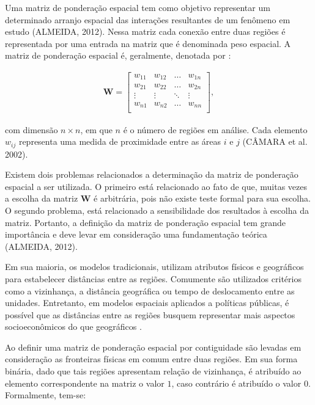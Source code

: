 \documentclass[12pt, a4paper,brazil,oneside]{article}
\begin{document}
	
	Uma matriz de ponderação espacial tem como objetivo representar um determinado arranjo espacial das interações resultantes de um fenômeno em estudo (ALMEIDA, 2012). Nessa matriz cada conexão entre duas regiões é representada por uma entrada na matriz que é denominada peso espacial. A matriz de ponderação espacial é, geralmente, denotada por : 
	
	\begin{align*}
	\boldsymbol{W} =
	\left[
	\begin{array}{cccc}
	w_{11} & w_{12} & \dots & w_{1n} \\
	w_{21} & w_{22} & \dots &w_{2n} \\
	\vdots & \vdots & \ddots & \vdots \\
	w_{n1} & w_{n2} & \dots & w_{nn}\\
	\end{array}
	\right],
	\end{align*}
	
	\noindent com dimensão $n \times n$, em que $n$ é o número de regiões em análise. Cada elemento $w_{ij}$ representa uma medida de proximidade entre as áreas $i$ e $j$ (CÂMARA et al. 2002). 
	
	Existem dois problemas relacionados a determinação da matriz de ponderação espacial a ser utilizada. O primeiro está relacionado ao fato de que, muitas vezes a escolha da matriz $\boldsymbol{W}$ é arbitrária, pois não existe teste formal para sua escolha. O segundo problema, está relacionado a sensibilidade dos resultados à escolha da matriz. Portanto, a definição da matriz de ponderação espacial tem grande importância e deve levar em consideração uma fundamentação teórica (ALMEIDA, 2012). 
	
	Em sua maioria, os modelos tradicionais, utilizam atributos físicos e geográficos para estabelecer distâncias entre as regiões. Comumente são utilizados critérios como a vizinhança, a distância geográfica ou tempo de deslocamento entre as unidades. Entretanto, em modelos espaciais aplicados a políticas públicas, é possível que as distâncias entre as regiões busquem representar mais aspectos socioeconômicos do que geográficos \cite{tyszler06}. 
	
	Ao definir uma matriz de ponderação espacial por contiguidade são levadas em consideração as fronteiras físicas em comum entre duas regiões. Em sua forma binária, dado que tais regiões apresentam relação de vizinhança, é atribuído ao elemento correspondente na matriz o valor $1$, caso contrário é atribuído o valor $0$. Formalmente, tem-se:
	
\end{document}
